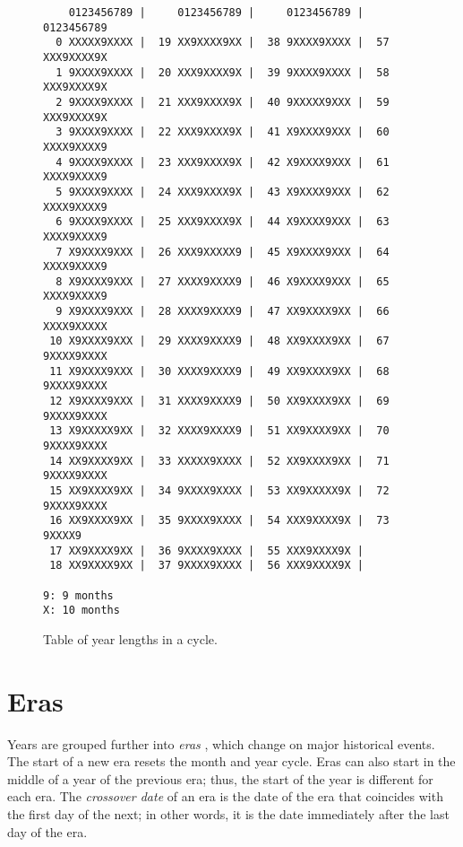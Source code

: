 \documentclass{book}
\begin{document}
\begin{figure}[ht]
    \caption{Table of year lengths in a cycle. \label{fig:years}}
    \centering
    \begin{verbatim}
    0123456789 |     0123456789 |     0123456789 |     0123456789
  0 XXXXX9XXXX |  19 XX9XXXX9XX |  38 9XXXX9XXXX |  57 XXX9XXXX9X
  1 9XXXX9XXXX |  20 XXX9XXXX9X |  39 9XXXX9XXXX |  58 XXX9XXXX9X
  2 9XXXX9XXXX |  21 XXX9XXXX9X |  40 9XXXXX9XXX |  59 XXX9XXXX9X
  3 9XXXX9XXXX |  22 XXX9XXXX9X |  41 X9XXXX9XXX |  60 XXXX9XXXX9
  4 9XXXX9XXXX |  23 XXX9XXXX9X |  42 X9XXXX9XXX |  61 XXXX9XXXX9
  5 9XXXX9XXXX |  24 XXX9XXXX9X |  43 X9XXXX9XXX |  62 XXXX9XXXX9
  6 9XXXX9XXXX |  25 XXX9XXXX9X |  44 X9XXXX9XXX |  63 XXXX9XXXX9
  7 X9XXXX9XXX |  26 XXX9XXXXX9 |  45 X9XXXX9XXX |  64 XXXX9XXXX9
  8 X9XXXX9XXX |  27 XXXX9XXXX9 |  46 X9XXXX9XXX |  65 XXXX9XXXX9
  9 X9XXXX9XXX |  28 XXXX9XXXX9 |  47 XX9XXXX9XX |  66 XXXX9XXXXX
 10 X9XXXX9XXX |  29 XXXX9XXXX9 |  48 XX9XXXX9XX |  67 9XXXX9XXXX
 11 X9XXXX9XXX |  30 XXXX9XXXX9 |  49 XX9XXXX9XX |  68 9XXXX9XXXX
 12 X9XXXX9XXX |  31 XXXX9XXXX9 |  50 XX9XXXX9XX |  69 9XXXX9XXXX
 13 X9XXXXX9XX |  32 XXXX9XXXX9 |  51 XX9XXXX9XX |  70 9XXXX9XXXX
 14 XX9XXXX9XX |  33 XXXXX9XXXX |  52 XX9XXXX9XX |  71 9XXXX9XXXX
 15 XX9XXXX9XX |  34 9XXXX9XXXX |  53 XX9XXXXX9X |  72 9XXXX9XXXX
 16 XX9XXXX9XX |  35 9XXXX9XXXX |  54 XXX9XXXX9X |  73 9XXXX9    
 17 XX9XXXX9XX |  36 9XXXX9XXXX |  55 XXX9XXXX9X | 
 18 XX9XXXX9XX |  37 9XXXX9XXXX |  56 XXX9XXXX9X | 

9: 9 months
X: 10 months
    \end{verbatim}
\end{figure}

\section{Eras}

Years are grouped further into \emph{eras} , which change on major historical events. The start of a new era resets the month and year cycle. Eras can also start in the middle of a year of the previous era; thus, the start of the year is different for each era. The \emph{crossover date} of an era is the date of the era that coincides with the first day of the next; in other words, it is the date immediately after the last day of the era.
\end{document}
